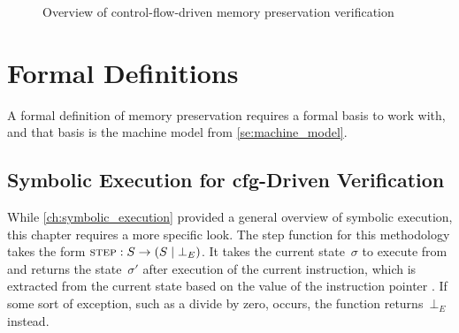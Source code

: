 \begin{figure}
  \centering
  \caption{Overview of control-flow-driven memory preservation verification}\label{fig:cfg_overview}
\end{figure}

\section{Formal Definitions}\label{se:cfg_defs}
A formal definition of memory preservation requires a formal basis to work with,
and that basis is the machine model from \cref{se:machine_model}.

\subsection{Symbolic Execution for \acs*{cfg}-Driven Verification}\label{cfg_symb_exec}
While \cref{ch:symbolic_execution} provided a general overview of symbolic execution,
this chapter requires a more specific look.
The step function for this methodology takes the form
$\operatorname{\textsc{step}}:S\rightarrow(S\mid\bot_E)$.%
%
It takes the current state~$\sigma$ to execute from
and returns the state~$\sigma'$ after execution of the current instruction,
which is extracted from the current state based on the value of the instruction pointer
.
If some sort of exception, such as a divide by zero, occurs,
the function returns~$\bot_E$ instead.

